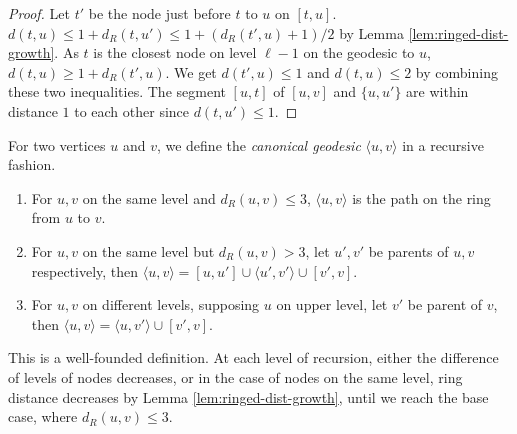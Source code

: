 \documentclass[11pt]{article}
\begin{document}
\begin{proof}
Let $t'$ be the node just before $t$ to $u$ on $[t,u]$. $d(t,u) \leq 1 + d_R(t,u') \leq 1 + (d_R(t',u)+1)/2$ by Lemma \ref{lem:ringed-dist-growth}. As $t$ is the closest node on level $\ell-1$ on the geodesic to $u$, $d(t,u) \geq 1 + d_R(t',u)$. 
We get $d(t',u) \le 1$ and $d(t,u) \leq 2$ by combining these two inequalities. 
The segment $[u,t]$ of $[u,v]$ and $\{ u,u'\}$ are within distance $1$ to 
	each other since $d(t,u') \leq 1$.
\end{proof}





For two vertices $u$ and $v$, we define the {\em canonical geodesic} $\langle u,v \rangle$ in a recursive fashion.
\begin{enumerate}
\item For $u,v$ on the same level and $d_R(u,v) \leq 3$, $\langle u,v \rangle$ is the path on the ring from $u$ to $v$.
\item For $u,v$ on the same level but $d_R(u,v) > 3$, let $u', v'$ be parents of $u,v$ respectively, then $\langle u,v \rangle = 
	[u,u'] \cup \langle u', v' \rangle \cup [v',v]$.
\item 
For $u,v$ on different levels, supposing $u$ on upper level, let $v'$ be parent of $v$, then $\langle u,v \rangle = \langle u, v' \rangle \cup 
	[v',v]$.
\end{enumerate}
This is a well-founded definition. At each level of recursion, either the difference of levels of nodes decreases, or in the case of nodes on the same level, ring distance decreases by Lemma \ref{lem:ringed-dist-growth}, until we reach the base case, where $d_R(u,v) \leq 3$.
\end{document}

